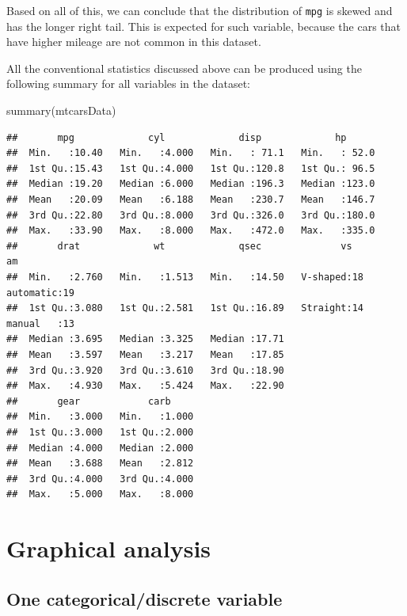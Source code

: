 \documentclass[
]{book}
\newenvironment{Shaded}{\begin{snugshade}}{\end{snugshade}}
\newcommand{\FunctionTok}[1]{\textcolor[rgb]{0.00,0.00,0.00}{#1}}
\newcommand{\NormalTok}[1]{#1}
\theoremstyle{definition}
\theoremstyle{definition}
\theoremstyle{definition}
\theoremstyle{definition}
\theoremstyle{remark}
\begin{document}
Based on all of this, we can conclude that the distribution of \texttt{mpg} is skewed and has the longer right tail. This is expected for such variable, because the cars that have higher mileage are not common in this dataset.

All the conventional statistics discussed above can be produced using the following summary for all variables in the dataset:

\begin{Shaded}
\begin{Highlighting}[]
\FunctionTok{summary}\NormalTok{(mtcarsData)}
\end{Highlighting}
\end{Shaded}

\begin{verbatim}
##       mpg             cyl             disp             hp       
##  Min.   :10.40   Min.   :4.000   Min.   : 71.1   Min.   : 52.0  
##  1st Qu.:15.43   1st Qu.:4.000   1st Qu.:120.8   1st Qu.: 96.5  
##  Median :19.20   Median :6.000   Median :196.3   Median :123.0  
##  Mean   :20.09   Mean   :6.188   Mean   :230.7   Mean   :146.7  
##  3rd Qu.:22.80   3rd Qu.:8.000   3rd Qu.:326.0   3rd Qu.:180.0  
##  Max.   :33.90   Max.   :8.000   Max.   :472.0   Max.   :335.0  
##       drat             wt             qsec              vs             am    
##  Min.   :2.760   Min.   :1.513   Min.   :14.50   V-shaped:18   automatic:19  
##  1st Qu.:3.080   1st Qu.:2.581   1st Qu.:16.89   Straight:14   manual   :13  
##  Median :3.695   Median :3.325   Median :17.71                               
##  Mean   :3.597   Mean   :3.217   Mean   :17.85                               
##  3rd Qu.:3.920   3rd Qu.:3.610   3rd Qu.:18.90                               
##  Max.   :4.930   Max.   :5.424   Max.   :22.90                               
##       gear            carb      
##  Min.   :3.000   Min.   :1.000  
##  1st Qu.:3.000   1st Qu.:2.000  
##  Median :4.000   Median :2.000  
##  Mean   :3.688   Mean   :2.812  
##  3rd Qu.:4.000   3rd Qu.:4.000  
##  Max.   :5.000   Max.   :8.000
\end{verbatim}

\hypertarget{dataAnalysisGraphical}{%
\section{Graphical analysis}\label{dataAnalysisGraphical}}

\hypertarget{one-categoricaldiscrete-variable}{%
\subsection{One categorical/discrete variable}\label{one-categoricaldiscrete-variable}}
\end{document}
